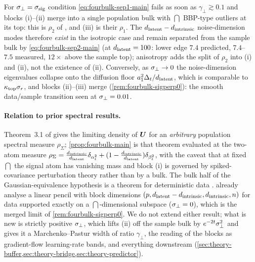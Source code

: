 \begin{remark}\label{rem:fourbulk-isotropic-main}
For $\sigma_{\perp}=\sigma_{\mathrm{sig}}$ condition \eqref{eq:fourbulk-sep1-main} fails as soon as $\gamma_\perp\gtrsim0.1$ and blocks (i)--(ii) merge into a single population bulk with $\dint$ BBP-type outliers at its top: this is $\rho_2$ of \citet{bonnaire2025}, and (iii) is their $\rho_1$. The $d_{\mathrm{latent}}-d_{\mathrm{intrinsic}}$ noise-dimension modes therefore \emph{exist} in the isotropic case and remain separated from the sample bulk by \eqref{eq:fourbulk-sep2-main} (at $d_{\mathrm{latent}}=100$: lower edge $7.4$ predicted, $7.4$--$7.5$ measured, $12\times$ above the sample top); anisotropy adds the split of $\rho_2$ into (i) and (ii), not the existence of (ii). Conversely, as $\sigma_{\perp}\to0$ the noise-dimension eigenvalues collapse onto the diffusion floor $a_1^2\Delta_t/d_{\mathrm{latent}}$, which is comparable to $\kappa_{\rm top}\sigma_r$, and blocks (ii)--(iii) merge (\cref{rem:fourbulk-sigperp0}): the smooth data/sample transition seen at $\sigma_{\perp}=0.01$.
\end{remark}

\paragraph{Relation to prior spectral results.}
Theorem~3.1 of \citet{bonnaire2025} gives the limiting density of $\bm{U}$ for an \emph{arbitrary} population spectral measure $\rho_\Sigma$; \cref{prop:fourbulk-main} is that theorem evaluated at the two-atom measure $\rho_\Sigma=\tfrac{d_{\mathrm{intrinsic}}}{d_{\mathrm{latent}}}\delta_{\alpha_t^2}+(1-\tfrac{d_{\mathrm{intrinsic}}}{d_{\mathrm{latent}}})\delta_{\beta_t^2}$, with the caveat that at fixed $\dint$ the signal atom has vanishing mass and block (i) is governed by spiked-covariance perturbation theory \citep{baik2005phase} rather than by a bulk. The bulk half of the Gaussian-equivalence hypothesis is a theorem for deterministic data \citep{louart2018random,liao2018spectrum}. \citet{george2025dsm} already analyse a linear pencil with block dimensions $(p,d_{\mathrm{latent}}-d_{\mathrm{intrinsic}},d_{\mathrm{intrinsic}},n)$ for data supported exactly on a $\dint$-dimensional subspace ($\sigma_{\perp}=0$), which is the merged limit of \cref{rem:fourbulk-sigperp0}. We do not extend either result; what is new is strictly positive $\sigma_{\perp}$, which lifts (ii) off the sample bulk by $e^{-2t}\sigma_{\perp}^2$ and gives it a Marchenko--Pastur width of ratio $\gamma_\perp$, the reading of the blocks as gradient-flow learning-rate bands, and everything downstream (\cref{sec:theory-buffer,sec:theory-bridge,sec:theory-predictor}).

